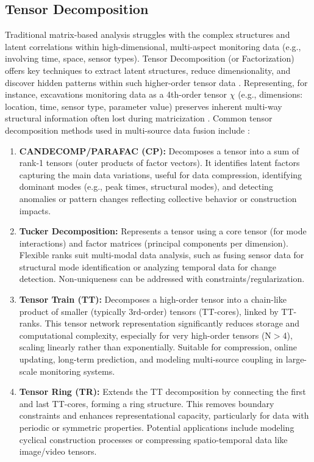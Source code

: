 \documentclass[preprint,11pt,authoryear,3p]{elsarticle}
\begin{document}
\subsection{Tensor Decomposition}

Traditional matrix-based analysis struggles with the complex structures and latent correlations within high-dimensional, multi-aspect monitoring data (e.g., involving time, space, sensor types). Tensor Decomposition (or Factorization) offers key techniques to extract latent structures, reduce dimensionality, and discover hidden patterns within such higher-order tensor data \citep{7891546}. Representing, for instance, excavations monitoring data as a 4th-order tensor $\chi$ (e.g., dimensions: location, time, sensor type, parameter value) preserves inherent multi-way structural information often lost during matricization \citep{adarkwa2015tensor}. Common tensor decomposition methods used in multi-source data fusion include \citep{SALEHI2023106659}:

\begin{enumerate}
    \item \textbf{CANDECOMP/PARAFAC (CP):} Decomposes a tensor into a sum of rank-1 tensors (outer products of factor vectors). It identifies latent factors capturing the main data variations, useful for data compression, identifying dominant modes (e.g., peak times, structural modes), and detecting anomalies or pattern changes reflecting collective behavior or construction impacts.

    \item \textbf{Tucker Decomposition:} Represents a tensor using a core tensor (for mode interactions) and factor matrices (principal components per dimension). Flexible ranks suit multi-modal data analysis, such as fusing sensor data for structural mode identification or analyzing temporal data for change detection. Non-uniqueness can be addressed with constraints/regularization.

    \item \textbf{Tensor Train (TT):} Decomposes a high-order tensor into a chain-like product of smaller (typically 3rd-order) tensors (TT-cores), linked by TT-ranks. This tensor network representation significantly reduces storage and computational complexity, especially for very high-order tensors (N$>$4), scaling linearly rather than exponentially. Suitable for compression, online updating, long-term prediction, and modeling multi-source coupling in large-scale monitoring systems.

    \item \textbf{Tensor Ring (TR):} Extends the TT decomposition by connecting the first and last TT-cores, forming a ring structure. This removes boundary constraints and enhances representational capacity, particularly for data with periodic or symmetric properties. Potential applications include modeling cyclical construction processes or compressing spatio-temporal data like image/video tensors.
\end{enumerate}
\end{document}
